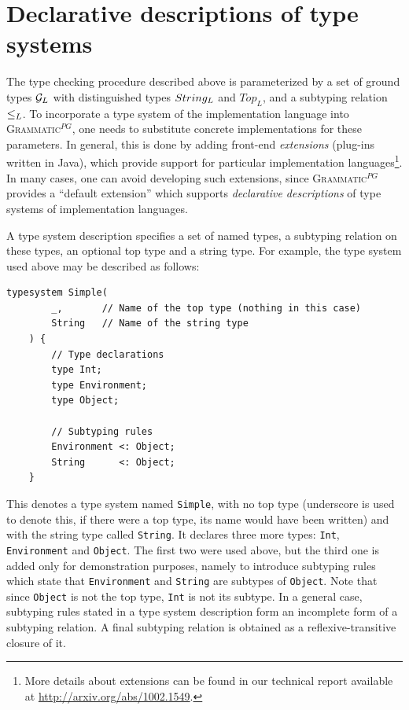 \documentclass{llncs2e/llncs}
\newcommand{\ATF}{\textsc{Grammatic}$^{PG}$}
\begin{document}

\section{Declarative descriptions of type systems}\label{DefaultExtension}

The type checking procedure described above is parameterized by a set of ground types ${\mathcal{G}_L}$ with distinguished types $String_L$ and $Top_L$, and a subtyping relation~$\le_L$. To incorporate a type system of the implementation language into \ATF{}, one needs to substitute concrete implementations for these parameters. In general, this is done by adding front-end \emph{extensions} (plug-ins written in Java), which provide support for particular implementation languages\footnote{More details about extensions can be found in our technical report available at \url{http://arxiv.org/abs/1002.1549}.}. In many cases, one can avoid developing such extensions, since \ATF{} provides a ``default extension'' which supports \emph{declarative descriptions} of type systems of implementation languages. 

A type system description specifies a set of named types, a subtyping relation on these types, an optional top type and a string type. For example, the type system used above may be described as follows:
\begin{lstlisting}[language=Typesystem]
	typesystem Simple( 
		_,       // Name of the top type (nothing in this case)
		String   // Name of the string type
	) {
		// Type declarations
		type Int;
		type Environment;
		type Object;

		// Subtyping rules
		Environment <: Object;
		String      <: Object;
	}
\end{lstlisting}
This denotes a type system named \texttt{Simple}, with no top type (underscore is used to denote this, if there were a top type, its name would have been written) and with the string type called \texttt{String}. It declares three more types: \texttt{Int}, \texttt{Environment} and \texttt{Object}. The first two were used above, but the third one is added only for demonstration purposes, namely to introduce subtyping rules which state that \texttt{Environment} and \texttt{String} are subtypes of \texttt{Object}. Note that since \texttt{Object} is not the top type, \texttt{Int} is not its subtype. In a general case, subtyping rules stated in a type system description form an incomplete form of a subtyping relation. A final subtyping relation is obtained as a reflexive-transitive closure of it.
\end{document}
